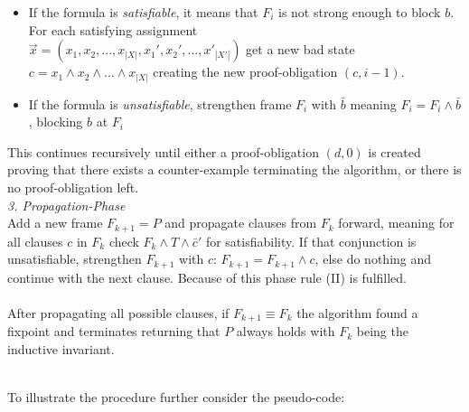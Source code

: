 \documentclass[11pt, a4paper, BCOR=10mm, ngerman, oneside]{scrbook}
\begin{document}
\begin{itemize}
\item If the formula is \textsl{satisfiable}, it means that $F_{i}$ is not strong enough to block $b$. For each satisfying assignment \\ $\vec{x} = (x_1, x_2, ..., x_{|X|}, x_1', x_2', ..., x'_{|X'|})$ get a new bad state \\ $c = x_1 \land x_2 \land ... \land x_{|X|}$ creating the new proof-obligation $(c, i-1)$.

\item If the formula is \textsl{unsatisfiable}, strengthen frame $F_{i}$ with $\bar b$ meaning $F_i = F_i \land \bar b$, blocking $b$ at $F_{i}$ 

\end{itemize}

This continues recursively until either a proof-obligation $(d, 0)$ is created proving that there exists a counter-example terminating the algorithm, or
there is no proof-obligation left. \\

\textsl{3. Propagation-Phase}\\ Add a new frame $F_{k + 1} = P$ and propagate clauses from $F_{k}$ forward, meaning for all clauses $c$ in $F_{k}$ check $F_{k} \land T \land \bar c'$ for satisfiability. If that conjunction is unsatisfiable, strengthen $F_{k+1}$ with $c$: $F_{k+1} = F_{k+1} \land c$, else do nothing and continue with the next clause. Because of this phase rule (II) is fulfilled.\\ \\
After propagating all possible clauses, if $F_{k+1} \equiv F_{k}$ the algorithm found a fixpoint and terminates returning that $P$ always holds with $F_k$ being the inductive invariant. \\ \\

\pagebreak

To illustrate the procedure further consider the pseudo-code: \\
\end{document}
